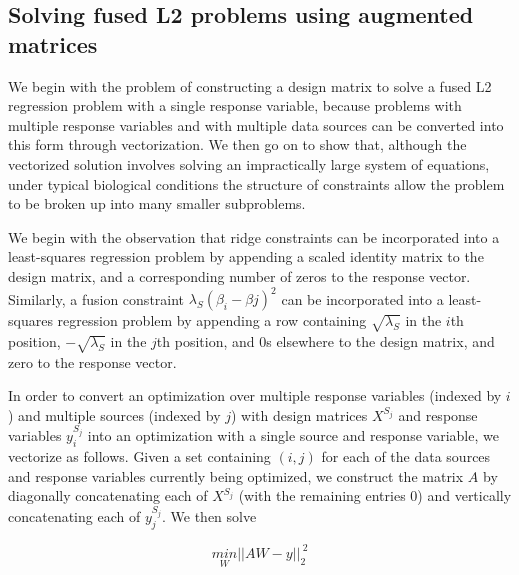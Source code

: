 \documentclass[11pt]{article}
\begin{document}
\subsection{Solving fused L2 problems using augmented matrices}
We begin with the problem of constructing a design matrix to solve a fused L2 regression problem with a single response variable, because problems with multiple response variables and with multiple data sources can be converted into this form through vectorization. We then go on to show that, although the vectorized solution involves solving an impractically large system of equations, under typical biological conditions the structure of constraints allow the problem to be broken up into many smaller subproblems. 

We begin with the observation that ridge constraints can be incorporated into a least-squares regression problem by appending a scaled identity matrix to the design matrix, and a corresponding number of zeros to the response vector. Similarly, a fusion constraint $\lambda_S (\beta_{i} - \beta{j})^2$ can be incorporated into a least-squares regression problem by appending a row containing $\sqrt{\lambda_S}$ in the $i$th position, $-\sqrt{\lambda_S}$ in the $j$th position, and $0$s elsewhere to the design matrix, and zero to the response vector. 

In order to convert an optimization over multiple response variables (indexed by $i$) and multiple sources (indexed by $j$) with design matrices $X^{S_j}$ and response variables $y_i^{S_j}$ into an optimization with a single source and response variable, we vectorize as follows. Given a set containing $(i,j)$ for each of the data sources and response variables currently being optimized, we construct the matrix $A$ by diagonally concatenating each of $X^{S_j}$ (with the remaining entries 0) and vertically concatenating each of $y_j^{S_j}$. We then solve

$$\underset{W}{min} ||AW - y||_2^{~2}$$
\end{document}
